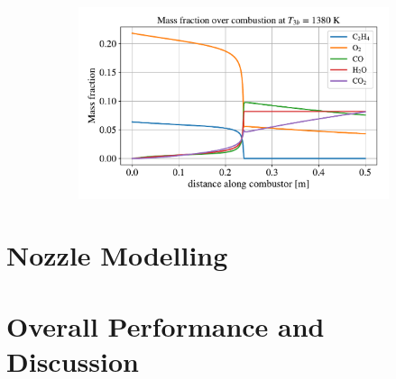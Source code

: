 \documentclass[a4paper]{article}
\begin{document}
\begin{figure}[h]
\begin{subfigure}[h]{0.49\linewidth}
    \end{subfigure}
    \begin{subfigure}[h]{0.49\linewidth}
        \includegraphics[width=\linewidth]{part_2_img/mass_fraction_1380.pdf}
    \end{subfigure}
\end{figure}

\section{Nozzle Modelling}

\section{Overall Performance and Discussion}
\end{document}
